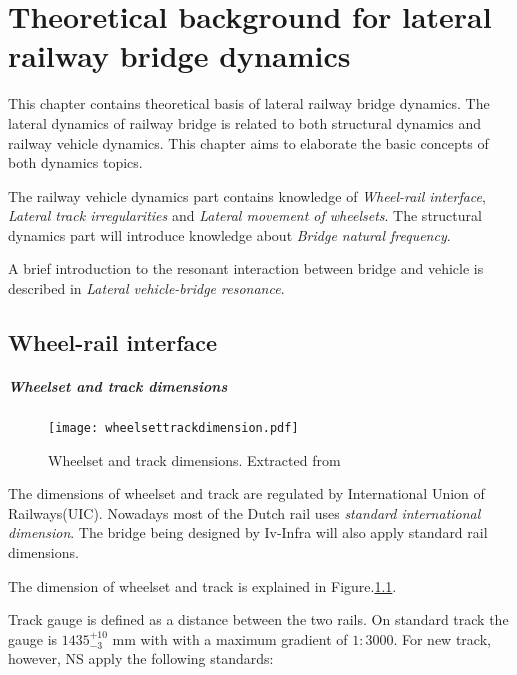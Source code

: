 
\chapter{Theoretical background for lateral railway bridge dynamics}

This chapter contains theoretical basis of lateral railway bridge dynamics. The lateral dynamics of railway bridge is related to both structural dynamics and railway vehicle dynamics. This chapter aims to elaborate the basic concepts of both dynamics topics.

The railway vehicle dynamics part contains knowledge of \emph{Wheel-rail interface}, \emph{Lateral track irregularities} and \emph{Lateral movement of wheelsets}. The structural dynamics part will introduce knowledge about \emph{Bridge natural frequency}.

A brief introduction to the resonant interaction between bridge and vehicle is described in \emph{Lateral vehicle-bridge resonance}.

\section{Wheel-rail interface} 

\paragraph{Wheelset and track dimensions}

\begin{figure}[h!]
\centering
\texttt{[image: wheelsettrackdimension.pdf]}
\caption{Wheelset and track dimensions. Extracted from \citep[p.17]{esveld2001modern}}
\label{fig:wheelset and track dimensions}
\end{figure}
 
The dimensions of wheelset and track are regulated by International Union of Railways(UIC). Nowadays most of the Dutch rail uses \emph{standard international dimension}. The bridge being designed by Iv-Infra will also apply standard rail dimensions.

The dimension of wheelset and track is explained in Figure.\ref{fig:wheelset and track dimensions}.

Track gauge is defined as a distance between the two rails. On standard track the gauge is $1435^{+10}_{-3}$ mm with with a maximum gradient of $1:3000$. For new track, however, NS apply the following standards\cite{esveld2001modern}:

